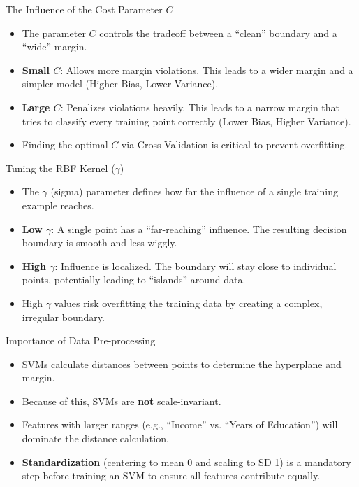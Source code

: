 \documentclass[aspectratio=169]{beamer}
\begin{document}
\begin{frame}{The Influence of the Cost Parameter $C$}
    \begin{itemize}
        \item The parameter $C$ controls the tradeoff between a ``clean'' boundary and a ``wide'' margin.
        \item \textbf{Small $C$}: Allows more margin violations. This leads to a wider margin and a simpler model (Higher Bias, Lower Variance).
        \item \textbf{Large $C$}: Penalizes violations heavily. This leads to a narrow margin that tries to classify every training point correctly (Lower Bias, Higher Variance).
        \item Finding the optimal $C$ via Cross-Validation is critical to prevent overfitting.
    \end{itemize}
\end{frame}

\begin{frame}{Tuning the RBF Kernel ($\gamma$)}
    \begin{itemize}
        \item The $\gamma$ (sigma) parameter defines how far the influence of a single training example reaches.
        \item \textbf{Low $\gamma$}: A single point has a ``far-reaching'' influence. The resulting decision boundary is smooth and less wiggly.
        \item \textbf{High $\gamma$}: Influence is localized. The boundary will stay close to individual points, potentially leading to ``islands'' around data.
        \item High $\gamma$ values risk overfitting the training data by creating a complex, irregular boundary.
    \end{itemize}
\end{frame}

\begin{frame}{Importance of Data Pre-processing}
    \begin{itemize}
        \item SVMs calculate distances between points to determine the hyperplane and margin.
        \item Because of this, SVMs are \textbf{not} scale-invariant.
        \item Features with larger ranges (e.g., ``Income'' vs. ``Years of Education'') will dominate the distance calculation.
        \item \textbf{Standardization} (centering to mean 0 and scaling to SD 1) is a mandatory step before training an SVM to ensure all features contribute equally.
    \end{itemize}
\end{frame}
\end{document}

